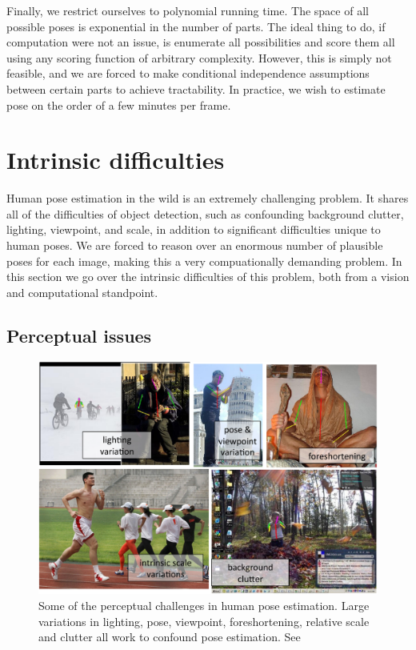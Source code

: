 Finally, we restrict ourselves to polynomial running time.  The space of all 
possible poses is exponential in the number of parts. The 
ideal thing to do, if computation were not an issue, is enumerate all 
possibilities and score them all using any scoring function of arbitrary 
complexity. However, this is simply not feasible, and we are forced to make 
conditional independence assumptions between certain parts to achieve 
tractability.  In practice, we wish to estimate pose on the order of a few 
minutes per frame.

\section{Intrinsic difficulties}
Human pose estimation in the wild is an extremely challenging problem.  It 
shares all of the difficulties of object detection, such as confounding 
background clutter, lighting, viewpoint, and scale, in addition to
significant difficulties unique to human poses.  We are forced to reason over 
an enormous number of plausible poses for each image, making this a very 
compuationally demanding problem.  In this section we go over the intrinsic 
difficulties of this problem, both from a vision and computational standpoint.

\subsection{Perceptual issues}\label{sec:perceptual}
\begin{figure}[tb]
\begin{center}
\includegraphics[width=1.05\textwidth]{figs/perceptual-issues.pdf}
\caption[Perceptual difficulties in pose estimation]{Some of the perceptual 
challenges in human pose estimation.  Large variations in lighting, pose, 
viewpoint, foreshortening, relative scale and clutter all work to confound pose 
estimation.  See~}
\label{fig:perceptual-issues}
\end{center}
\end{figure}

